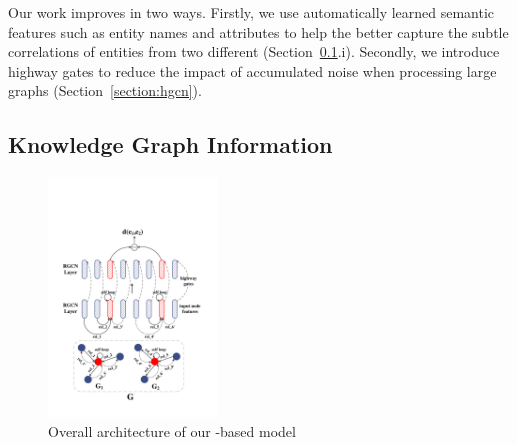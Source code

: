  Our work improves \RGCNs in two ways. Firstly, we use automatically learned semantic features such as entity names and attributes to
 help the \RGCN better capture the subtle correlations of entities from two different \KGs (Section~\ref{section:rgcn}.i).
    Secondly, we introduce highway gates to reduce the impact of accumulated noise when processing large graphs (Section~\ref{section:hgcn}).




	



	
	\subsection{Knowledge Graph Information}
	\label{section:rgcn}	
\begin{figure}
	\centering
	\includegraphics[width=0.4\textwidth]{figures/RGCN.pdf}
	\caption{Overall architecture of our \RGCN-based model}\label{fig:all}
\end{figure}

